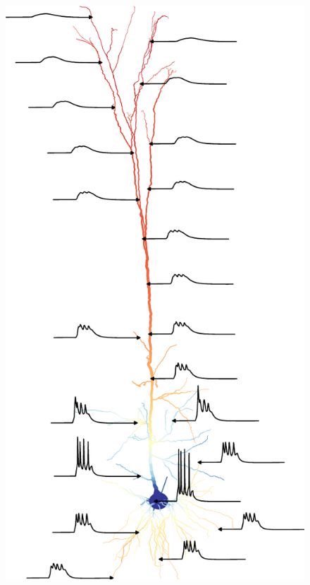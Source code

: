 \documentclass{beamer}
\begin{document}
\begin{frame}[t, fragile]
\begin{columns}
    \begin{column}{0.24\textwidth}
      \begin{figure}[h]
        \includegraphics[width=\textwidth]{./benchmark/5a_cropped.pdf}
      \end{figure}
    \end{column}
  \end{columns}


\end{frame}
\end{document}
